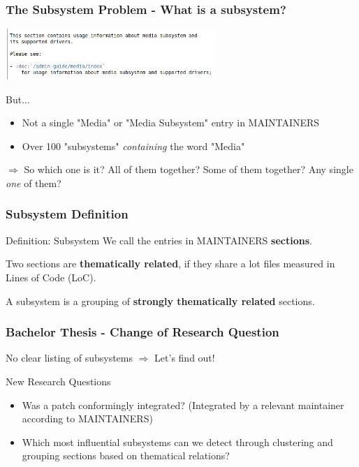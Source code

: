 \documentclass{beamer}
\begin{document}
	\begin{frame}
	\frametitle{The Subsystem Problem - What is a subsystem?}
     	\includegraphics[width=0.6\textwidth]{pics/Media_subsystem.png}

	\begin{block}{But... }
		\begin{itemize}
		\item Not a single "Media" or "Media Subsystem" entry in MAINTAINERS
		\item Over 100 "subsystems" \textit{containing} the word "Media"
		\end{itemize}
	\end{block}
	$\Rightarrow$ So which one is it? All of them together? Some of them together? Any single \textit{one} of them?
	\end{frame}

	\begin{frame} %
	\frametitle{Subsystem Definition}
		\begin{block}{Definition: Subsystem}
			We call the entries in MAINTAINERS \textbf{sections}.

			Two sections are \textbf{thematically related}, if they share a lot files measured in Lines of Code (LoC).

			A subsystem is a grouping of \textbf{strongly thematically related} sections.
		\end{block}
	\end{frame}

	\begin{frame}
	\frametitle{Bachelor Thesis - Change of Research Question}
		\begin{block}{No clear listing of subsystems}
			$\Rightarrow$ Let's find out!
		\end{block}

		\begin{block}{New Research Questions}
			\begin{itemize}
				\item Was a patch conformingly integrated? (Integrated by a relevant maintainer according to MAINTAINERS)
				\item Which most influential subsystems can we detect through clustering and grouping sections based on thematical relations?
			\end{itemize}
		\end{block}
	\end{frame}
\end{document}
